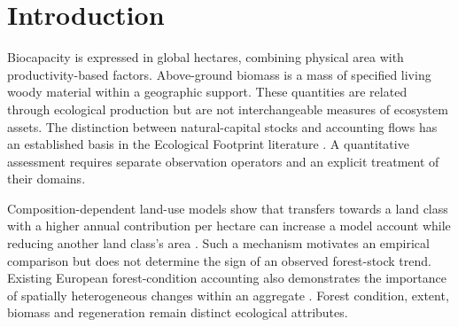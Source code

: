 \documentclass[11pt,a4paper]{article}
\begin{document}
\section{Introduction}
Biocapacity is expressed in global hectares, combining physical area with productivity-based factors. Above-ground biomass is a mass of specified living woody material within a geographic support. These quantities are related through ecological production but are not interchangeable measures of ecosystem assets. The distinction between natural-capital stocks and accounting flows has an established basis in the Ecological Footprint literature \citep{Mancini2017}. A quantitative assessment requires separate observation operators and an explicit treatment of their domains.

Composition-dependent land-use models show that transfers towards a land class with a higher annual contribution per hectare can increase a model account while reducing another land class's area \citep{Abaee2026}. Such a mechanism motivates an empirical comparison but does not determine the sign of an observed forest-stock trend. Existing European forest-condition accounting also demonstrates the importance of spatially heterogeneous changes within an aggregate \citep{Maes2023}. Forest condition, extent, biomass and regeneration remain distinct ecological attributes.
\end{document}

